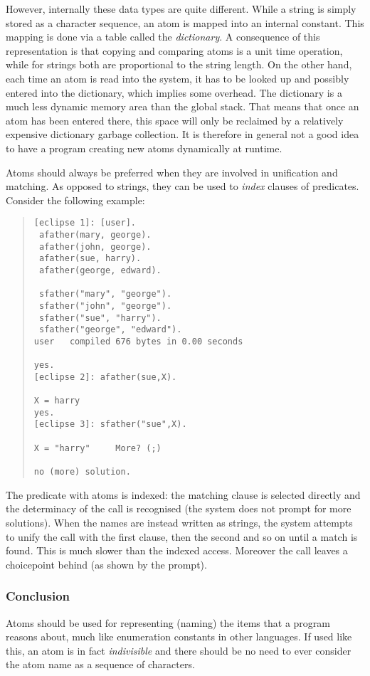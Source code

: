 However, internally these data types are quite different.
While a string is simply stored as a character sequence, an atom is mapped
into an internal constant.
This mapping is done via a table called the \emph{dictionary}.
A consequence of this representation is that copying and comparing atoms
is a unit time operation,
while for strings both are proportional to the string length.
On the other hand, each time an atom is read into the system, it has to
be looked up and possibly entered into the dictionary, which implies
some overhead.
The dictionary is a much less dynamic memory area than the global stack.
That means that once an atom has been entered there, this space will
only be reclaimed by a relatively expensive dictionary garbage collection.
It is therefore in general not a good idea to have a
program creating new atoms dynamically at runtime.

Atoms should always be preferred when they are involved in unification
and matching. As opposed to strings, they can be used to \emph{index}
clauses of predicates.
Consider the following example:
\begin{quote}
\begin{verbatim}
[eclipse 1]: [user].
 afather(mary, george).
 afather(john, george).
 afather(sue, harry).
 afather(george, edward).

 sfather("mary", "george").
 sfather("john", "george").
 sfather("sue", "harry").
 sfather("george", "edward").
user   compiled 676 bytes in 0.00 seconds

yes.
[eclipse 2]: afather(sue,X).

X = harry
yes.
[eclipse 3]: sfather("sue",X).

X = "harry"     More? (;)

no (more) solution.
\end{verbatim}
\end{quote}
The predicate with atoms is indexed: the matching
clause is selected directly and the determinacy of the call is recognised
(the system does not prompt for more solutions).
When the names are instead written as strings, the system attempts
to unify the call with the first clause, then the second and so on until
a match is found. This is much slower than the indexed access.
Moreover the call leaves a choicepoint behind (as shown by the
 prompt).

\subsubsection{Conclusion}
Atoms should be used for representing (naming) the items that a
program reasons about, much like enumeration constants in other languages.
If used like this, an atom is in fact {\em indivisible} and there should
be no need to ever consider the atom name as a sequence of characters.

